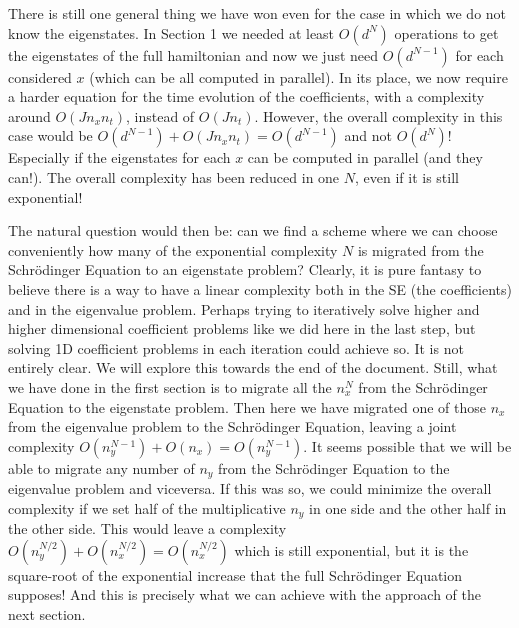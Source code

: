 \documentclass[11pt, a4paper]{article} %
\begin{document}
There is still one general thing we have won even for the case in which we do not know the eigenstates. In Section 1 we needed at least $O(d^N)$ operations to get the eigenstates of the full hamiltonian and now we just need $O(d^{N-1})$ for each considered $x$ (which can be all computed in parallel). In its place, we now require a harder equation for the time evolution of the coefficients, with a complexity around $O(Jn_xn_t)$, instead of $O(Jn_t)$. However, the overall complexity in this case would be $O(d^{N-1})+O(Jn_xn_t)=O(d^{N-1})$ and not $O(d^N)$! Especially if the eigenstates for each $x$ can be computed in parallel (and they can!). The overall complexity has been reduced in one $N$, even if it is still exponential!

The natural question would then be: can we find a scheme where we can choose conveniently how many of the exponential complexity $N$ is migrated from the Schrödinger Equation to an eigenstate problem? Clearly, it is pure fantasy to believe there is a way to have a linear complexity both in the SE (the coefficients) and in the eigenvalue problem. Perhaps trying to iteratively solve higher and higher dimensional coefficient problems like we did here in the last step, but solving 1D coefficient problems in each iteration could achieve so. It is not entirely clear. We will explore this towards the end of the document. Still, what we have done in the first section is to migrate all the $n_x^N$ from the Schrödinger Equation to the eigenstate problem. Then here we have migrated one of those $n_x$ from the eigenvalue problem to the Schrödinger Equation, leaving a joint complexity $O(n_y^{N-1})+O(n_x)=O(n_y^{N-1})$. It seems possible that we will be able to migrate any number of $n_y$ from the Schrödinger Equation to the eigenvalue problem and viceversa. If this was so, we could minimize the overall complexity if we set half of the multiplicative $n_y$ in one side and the other half in the other side. This would leave a complexity $O(n_y^{N/2})+O(n_x^{N/2})=O(n_x^{N/2})$ which is still exponential, but it is the square-root of the exponential increase that the full Schrödinger Equation supposes! And this is precisely what we can achieve with the approach of the next section.
\newpage
\end{document}
